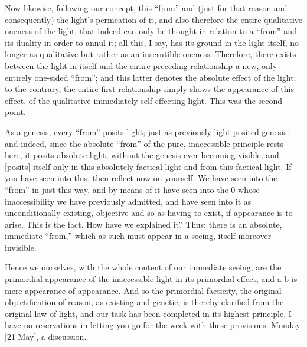 Now likewise, following our concept,
this “from” and (just for that reason and consequently)
the light's permeation of it,
and also therefore the entire
qualitative oneness of the light,
that indeed can only be thought in relation to
a “from” and its duality in order to annul it;
all this, I say, has its ground in the light itself,
no longer as qualitative but rather as an inscrutible oneness.
Therefore, there exists between the light in itself and
the entire preceding relationship
a new, only entirely one-sided “from”;
and this latter denotes the absolute effect of the light;
to the contrary, the entire first relationship simply shows
the appearance of this effect,
of the qualitative immediately self-effecting light.
This was the second point.

As a genesis, every “from” posits light;
just as previously light posited genesis:
and indeed, since the absolute “from” of
the pure, inaccessible principle rests here,
it posits absolute light,
without the genesis ever becoming visible,
and [posits] itself only
in this absolutely factical light
and from this factical light.
If you have seen into this,
then reflect now on yourself.
We have seen into the “from” in just this way,
and by means of it have seen into the 0
whose inaccessibility we have previously admitted,
and have seen into it as unconditionally existing,
objective and so as having to exist,
if appearance is to arise.
This is the fact.
How have we explained it?
Thus: there is an absolute, immediate “from,”
which as such must appear in a seeing,
itself moreover invisible.

Hence we ourselves,
with the whole content
of our immediate seeing,
are the primordial appearance
of the inaccessible light
in its primordial effect,
and a-b is mere appearance of appearance.
And so the primordial facticity,
the original objectification of reason,
as existing and genetic, is thereby clarified
from the original law of light,
and our task has been completed
in its highest principle.
I have no reservations in letting you go
for the week with these provisions.
Monday [21 May], a discussion.
